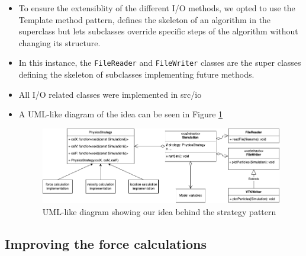 \documentclass{article}
\begin{document}
\begin{itemize}
    \item To ensure the extensiblity of the different I/O methods, we opted to use the Template method pattern,  defines the skeleton of an algorithm in the superclass but lets subclasses override specific steps of the algorithm without changing its structure.
    \item In this instance, the \verb|FileReader| and \verb|FileWriter| classes are the super classes defining the skeleton of subclasses implementing future methods. 
    \item All I/O related classes were implemented in src/io

    \item A UML-like diagram of the idea can be seen in Figure \ref{fig:strat}
    \begin{figure}[h]
        \includegraphics[width=\textwidth]{res/strategy_long.png}
        \caption{UML-like diagram showing our idea behind the strategy pattern}
        \label{fig:strat}
    \end{figure}

\end{itemize}

\subsection{Improving the force calculations}
\label{sec:Refactoring:forceimprovements}
\end{document}
